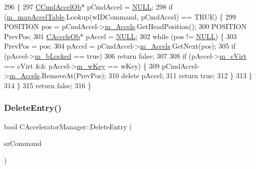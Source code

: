 \begin{DoxyCode}
296 \{
297   \mbox{\hyperlink{class_c_cmd_accel_ob}{CCmdAccelOb}}* pCmdAccel = \mbox{\hyperlink{getopt1_8c_a070d2ce7b6bb7e5c05602aa8c308d0c4}{NULL}};
298   \textcolor{keywordflow}{if} (\mbox{\hyperlink{class_c_accelerator_manager_a16b8d3e9328bc0eeeb048630deff2768}{m\_mapAccelTable}}.Lookup(wIDCommand, pCmdAccel) == TRUE) \{
299     POSITION pos = pCmdAccel->\mbox{\hyperlink{class_c_cmd_accel_ob_a85772f1ea9204af42b8a39a0135dc0f8}{m\_Accels}}.GetHeadPosition();
300     POSITION PrevPos;
301     \mbox{\hyperlink{class_c_accels_ob}{CAccelsOb}}* pAccel = \mbox{\hyperlink{getopt1_8c_a070d2ce7b6bb7e5c05602aa8c308d0c4}{NULL}};
302     \textcolor{keywordflow}{while} (pos != \mbox{\hyperlink{getopt1_8c_a070d2ce7b6bb7e5c05602aa8c308d0c4}{NULL}}) \{
303       PrevPos = pos;
304       pAccel = pCmdAccel->\mbox{\hyperlink{class_c_cmd_accel_ob_a85772f1ea9204af42b8a39a0135dc0f8}{m\_Accels}}.GetNext(pos);
305       \textcolor{keywordflow}{if} (pAccel->\mbox{\hyperlink{class_c_accels_ob_ad8300bd20bd429ad61f89700e388dd9a}{m\_bLocked}} == \textcolor{keyword}{true})
306         \textcolor{keywordflow}{return} \textcolor{keyword}{false};
307 
308       \textcolor{keywordflow}{if} (pAccel->\mbox{\hyperlink{class_c_accels_ob_a08b7003ccf92c6afcf31878960d8eee1}{m\_cVirt}} == cVirt && pAccel->\mbox{\hyperlink{class_c_accels_ob_a1891250e9a4d00c0862f3a90a965d635}{m\_wKey}} == wKey) \{
309         pCmdAccel->\mbox{\hyperlink{class_c_cmd_accel_ob_a85772f1ea9204af42b8a39a0135dc0f8}{m\_Accels}}.RemoveAt(PrevPos);
310         \textcolor{keyword}{delete} pAccel;
311         \textcolor{keywordflow}{return} \textcolor{keyword}{true};
312       \}
313     \}
314   \}
315   \textcolor{keywordflow}{return} \textcolor{keyword}{false};
316 \}
\end{DoxyCode}
\mbox{\label{class_c_accelerator_manager_ae20cd0e0259b70fe7443b442e85d1213}} 
\subsubsection{\texorpdfstring{Delete\+Entry()}{DeleteEntry()}\hspace{0.1cm}{\footnotesize\ttfamily [1/2]}}
{\footnotesize\ttfamily bool C\+Accelerator\+Manager\+::\+Delete\+Entry (\begin{DoxyParamCaption}\item[{L\+P\+C\+T\+S\+TR}]{sz\+Command }\end{DoxyParamCaption})}



